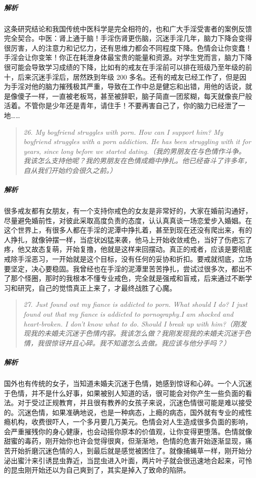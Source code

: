 \subparagraph{解析} 这条研究结论和我国传统中医科学是完全相符的，也和广大手淫受害者的案例反馈完全契合。中医：肾上通于脑！手淫伤肾更伤脑，沉迷手淫几年，脑力下降会变得很厉害，人的注意力和记忆力，还有思维力都会不同程度下降。色情会让你变蠢！手淫会让你变笨！你正在耗泄身体最宝贵的能量和资源。对学生党而言，脑力下降很可能会导致学习成绩的下降，比如有的戒友在手淫前可以排在班级乃至年级的前十，后来沉迷手淫后，居然跌到年级 200 多名。还有的戒友已经工作了，但是因为手淫对他的脑力摧残极其严重，导致在工作中总是健忘和出错，用他的话说，就是像傻子一样，一直被老板骂，甚至被辞职，脑子简直一团浆糊，每天就像丧尸般活着。不管你是少年还是青年，请住手！不要再害自己了，你的脑力已经泄了一地……

\begin{quote}\it
    26. My boyfriend struggles with porn. How can I support him? My boyfriend struggles with a porn addiction. He has been struggling with it for years, since long before we started dating.（我的男朋友在与色情作斗争。我该怎么支持他呢？我的男朋友在色情成瘾中挣扎。他已经奋斗了许多年，自从我们开始约会很久之前。）
\end{quote}

\subparagraph{解析} 很多戒友都有女朋友，有一个支持你戒色的女友是非常好的，大家在婚前沟通好，尽量避免婚前性，对彼此采取高度负责的态度，认认真真谈一场恋爱步入婚姻。在这个世界上，有很多人都在手淫的泥潭中挣扎着，甚至到现在还没有爬出来，有的人挣扎，就像钟摆一样，当症状凶猛来袭，他马上开始收敛戒色，当好了伤疤忘了疼，他又故态复萌，开始复撸，他就是这样来回摆动。真正的戒者，应该是要彻底戒除手淫恶习，一开始就是这个目标，没有任何的妥协和折扣。要戒就彻底，立场要坚定，决心要稳固。我曾经也在手淫的泥潭里苦苦挣扎，尝试过很多次，都出不了那个怪圈，那时的我根本不懂专业戒色，完全就是强戒和盲戒，后来通过不断学习和研究，自己的觉悟真正上来了，才最终战胜了心魔。

\begin{quote}\it
    27. Just found out my fiance is addicted to porn. What should I do? I just found out that my fiance is addicted to pornography.I am shocked and heart-broken. I don't know what to do. Should I break up with him?（刚发现我的未婚夫沉迷于色情内容。我该怎么做？我刚发现我的未婚夫沉迷于色情，我很惊讶并且心碎。我不知道怎么去做。我应该与他分手吗？）
\end{quote}

\subparagraph{解析} 国外也有传统的女子，当知道未婚夫沉迷于色情，她感到惊讶和心碎。一个人沉迷于色情，并不是什么好事，如果被别人知道的话，很可能会对你产生一些负面的看法。对于受过正规教育，并且很有教养的女孩子来说，沉迷色情很可能是难以接受的。沉迷色情，如果准确地说，也是一种病态，上瘾的病态，国外就有专业的戒性瘾机构，收费很吓人，一个多月要几万美元。色情会对人生造成很多负面的影响，会严重摧残你的身心健康，也会动摇你原本的价值观，让你变得更堕落。色情就像甜蜜的毒药，刚开始你也许会觉得很爽，但渐渐地，色情的危害开始逐渐显现，痛苦开始折磨沉迷色情的人，到最后就是感觉被困住了。就像捕蝇草一样，刚开始分泌出蜜汁来引诱昆虫靠近，当昆虫进入叶面，两片叶子就会很迅速地合起来，可怜的昆虫刚开始还以为自己爽到了，其实是掉入了致命的陷阱。

